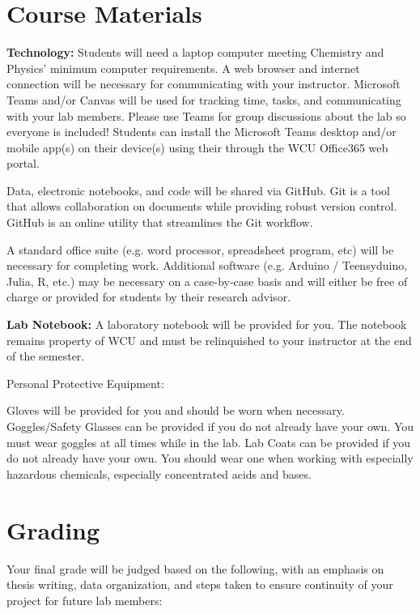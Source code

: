 \documentclass[11pt]{article}
\begin{document}
\section{Course Materials}
\label{sec:orgaaad583}

\textbf{Technology:} Students will need a laptop computer meeting Chemistry and Physics’ minimum computer requirements. A web browser and internet connection will be necessary for communicating with your instructor. Microsoft Teams and/or Canvas will be used for tracking time, tasks, and communicating with your lab members. Please use Teams for group discussions about the lab so everyone is included! Students can install the Microsoft Teams desktop and/or mobile app(s) on their device(s) using their through the WCU Office365 web portal.

Data, electronic notebooks, and code will be shared via GitHub. Git is a tool that allows collaboration on documents while providing robust version control. GitHub is an online utility that streamlines the Git workflow.

A standard office suite (e.g. word processor, spreadsheet program, etc) will be necessary for completing work. Additional software (e.g. Arduino / Teensyduino, Julia, R, etc.) may be necessary on a case-by-case basis and will either be free of charge or provided for students by their research advisor.

\textbf{Lab Notebook:} A laboratory notebook will be provided for you. The notebook remains property of WCU and must be relinquished to your instructor at the end of the semester.

Personal Protective Equipment:

Gloves will be provided for you and should be worn when necessary.
Goggles/Safety Glasses can be provided if you do not already have your own. You must wear goggles at all times while in the lab.
Lab Coats can be provided if you do not already have your own. You should wear one when working with especially hazardous chemicals, especially concentrated acids and bases.

\section{Grading}
\label{sec:org52336e5}

Your final grade will be judged based on the following, with an emphasis on thesis writing, data organization, and steps taken to ensure continuity of your project for future lab members:
\end{document}
